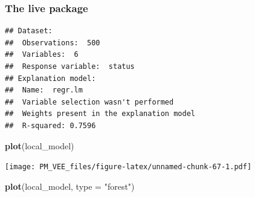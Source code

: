 \documentclass[12pt,]{krantz}
\newenvironment{Shaded}{\begin{snugshade}}{\end{snugshade}}
\newcommand{\ControlFlowTok}[1]{\textcolor[rgb]{0.13,0.29,0.53}{\textbf{#1}}}
\newcommand{\DataTypeTok}[1]{\textcolor[rgb]{0.13,0.29,0.53}{#1}}
\newcommand{\DecValTok}[1]{\textcolor[rgb]{0.00,0.00,0.81}{#1}}
\newcommand{\KeywordTok}[1]{\textcolor[rgb]{0.13,0.29,0.53}{\textbf{#1}}}
\newcommand{\NormalTok}[1]{#1}
\newcommand{\OperatorTok}[1]{\textcolor[rgb]{0.81,0.36,0.00}{\textbf{#1}}}
\newcommand{\StringTok}[1]{\textcolor[rgb]{0.31,0.60,0.02}{#1}}
\theoremstyle{definition}
\theoremstyle{definition}
\theoremstyle{definition}
\theoremstyle{remark}
\begin{document}
\hypertarget{the-live-package}{%
\subsubsection{\texorpdfstring{\textbf{The live
package}}{The live package}}\label{the-live-package}}

\begin{Shaded}
\end{Shaded}

\begin{verbatim}
## Dataset: 
##  Observations:  500 
##  Variables:  6 
##  Response variable:  status 
## Explanation model: 
##  Name:  regr.lm 
##  Variable selection wasn't performed 
##  Weights present in the explanation model 
##  R-squared: 0.7596
\end{verbatim}

\begin{Shaded}
\begin{Highlighting}[]
\KeywordTok{plot}\NormalTok{(local_model)}
\end{Highlighting}
\end{Shaded}

\texttt{[image: PM\_VEE\_files/figure-latex/unnamed-chunk-67-1.pdf]}

\begin{Shaded}
\begin{Highlighting}[]
\KeywordTok{plot}\NormalTok{(local_model, }\DataTypeTok{type =} \StringTok{"forest"}\NormalTok{)}
\end{Highlighting}
\end{Shaded}
\end{document}

